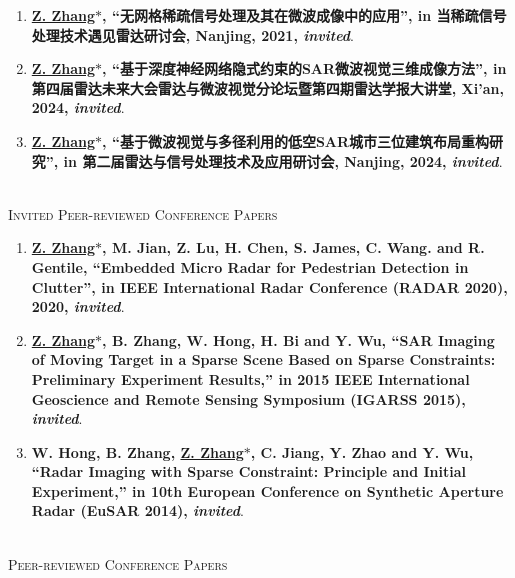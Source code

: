 \documentclass[paper=a4,fontsize=11pt]{scrartcl}
\begin{document}
\begin{enumerate}
	
	\item \textbf{\underline{Z. Zhang$\ast$}, ``无网格稀疏信号处理及其在微波成像中的应用'', in 当稀疏信号处理技术遇见雷达研讨会, Nanjing, 2021, \emph{invited}}.
	
	\item \textbf{\underline{Z. Zhang$\ast$}, ``基于深度神经网络隐式约束的SAR微波视觉三维成像方法'', in 第四届雷达未来大会雷达与微波视觉分论坛暨第四期雷达学报大讲堂, Xi'an, 2024, \emph{invited}}.
	
	\item \textbf{\underline{Z. Zhang$\ast$}, ``基于微波视觉与多径利用的低空SAR城市三位建筑布局重构研究'', in 第二届雷达与信号处理技术及应用研讨会, Nanjing, 2024, \emph{invited}}.
	
\end{enumerate}

~\\

\textsc{Invited Peer-reviewed Conference Papers}

\begin{enumerate}
	
	\item \textbf{\underline{Z. Zhang$\ast$}, M. Jian, Z. Lu, H. Chen, S. James, C. Wang. and R. Gentile, ``Embedded Micro Radar for Pedestrian Detection in Clutter'', in IEEE International Radar Conference (RADAR 2020), 2020, \emph{invited}}.
	
	\item \textbf{\underline{Z. Zhang$\ast$}, B. Zhang, W. Hong, H. Bi and Y. Wu, ``SAR Imaging of Moving Target in a Sparse Scene Based on Sparse Constraints: Preliminary Experiment Results,'' in 2015 IEEE International Geoscience and Remote Sensing Symposium (IGARSS 2015), \emph{invited}}.
	
	\item \textbf{W. Hong, B. Zhang, \underline{Z. Zhang$\ast$}, C. Jiang, Y. Zhao and Y. Wu, ``Radar Imaging with Sparse Constraint: Principle and Initial Experiment,'' in 10th European Conference on Synthetic Aperture Radar (EuSAR 2014), \emph{invited}}.
	
	
\end{enumerate}

~\\

\textsc{Peer-reviewed Conference Papers}
\end{document}
